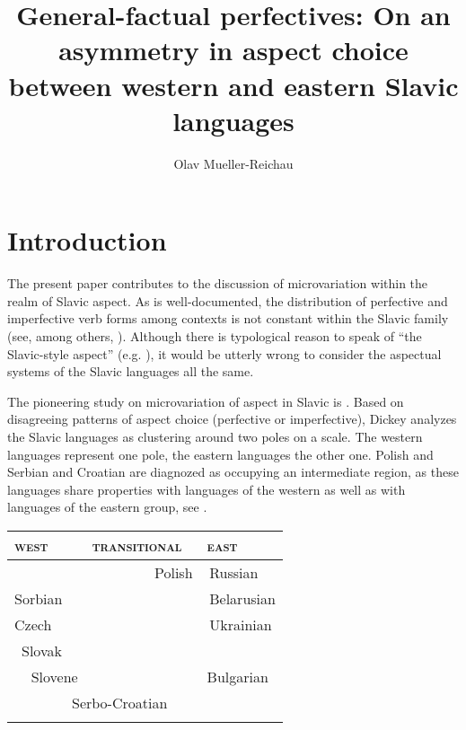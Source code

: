 \documentclass[output=paper,
modfonts,
newtxmath,
hidelinks
]{langscibook}
\title{General-factual perfectives: On an asymmetry in aspect choice between western and eastern Slavic languages}
\author{%
 Olav Mueller-Reichau\affiliation{University of Leipzig}
}
\begin{document}
\maketitle
{}

\section{Introduction}\label{13:s1} 

The present paper contributes to the discussion of microvariation within the realm of Slavic aspect. 
As is well-documented, the distribution 
of perfective and imperfective verb forms among contexts is not constant within the Slavic family (see, among others, \citealt{Stunova1991,Stunova1993,Breu2000,Petruchina2000,Dickey2000,Dickey15,Dickey18,Gehrke02,Wiemer08,Rivero10,Alvestad13,Gattnar13,Berger13,Rivero14,Duebbers15,FK15,FK18}).
Although there is typological reason to speak of ``the Slavic-style aspect'' (e.g. \citealt{Dahl85,Plungjan11}),
it would be utterly wrong to consider the aspectual systems of the Slavic languages all the same. 

The pioneering study on microvariation of aspect in Slavic is \citet{Dickey2000}. Based on disagreeing patterns of aspect choice (perfective or imperfective),
Dickey analyzes the Slavic languages as clustering around two poles on a scale. The western languages represent one pole, the eastern languages the other one. 
Polish and Serbian and Croatian are diagnozed as occupying an intermediate region, as these languages share properties with languages of the western as well as with 
languages of the eastern group, see .




\begin{table}
\centering
      \label{13:sd1}
      \begin{tabularx}{0.6\textwidth}{l l l}
\lsptoprule \textsc{west} & \textsc{transitional} & \textsc{east}\\
\midrule     &  $\quad\quad\quad\quad$ Polish & $\,$Russian \\
   Sorbian  &    & $\,$Belarusian \\
    Czech  &    &  $\,$Ukrainian\\ 
  $\,$  Slovak  &    &  \\
   $\,\,\,\,\,$  Slovene  &    & Bulgarian \\
        \multicolumn{2}{l}{$\quad\quad\quad\quad$Serbo-Croatian} & \\
\lspbottomrule
\end{tabularx}
\end{table}
\end{document}
